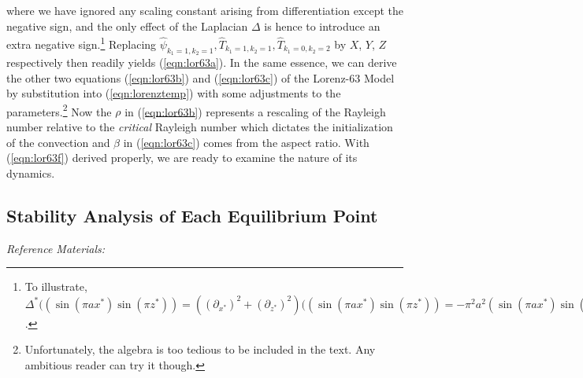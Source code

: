 where we have ignored any scaling constant arising from differentiation except the negative sign, and the only effect of the Laplacian $\Delta$ is hence to introduce an extra negative sign.\footnote{To illustrate, $\Delta^*((\sin(\pi a x^*)\sin(\pi z^*)) = ((\partial_{x^*})^2 + (\partial_{z^*})^2)((\sin(\pi a x^*)\sin(\pi z^*)) = -\pi^2a^2 (\sin(\pi a x^*)\sin(\pi z^*)) - \pi^2 (\sin(\pi a x^*)\sin(\pi z^*)) = -(\pi^2a^2 + \pi^2)(\sin(\pi a x^*)\sin(\pi z^*))$.} Replacing $\hat{\psi}_{k_1 = 1, k_2 = 1}, \hat{T}_{k_1 = 1, k_2 = 1}, \hat{T}_{k_1 = 0, k_2 = 2}$ by $X$, $Y$, $Z$ respectively then readily yields (\ref{eqn:lor63a}). In the same essence, we can derive the other two equations (\ref{eqn:lor63b}) and (\ref{eqn:lor63c}) of the Lorenz-63 Model by substitution into (\ref{eqn:lorenztemp}) with some adjustments to the parameters.\footnote{Unfortunately, the algebra is too tedious to be included in the text. Any ambitious reader can try it though.} Now the $\rho$ in (\ref{eqn:lor63b}) represents a rescaling of the Rayleigh number relative to the \textit{critical} Rayleigh number which dictates the initialization of the convection and $\beta$ in (\ref{eqn:lor63c}) comes from the aspect ratio. With (\ref{eqn:lor63f}) derived properly, we are ready to examine the nature of its dynamics.

\subsection{Stability Analysis of Each Equilibrium Point}

\textit{Reference Materials: \cite{lorenz}}

